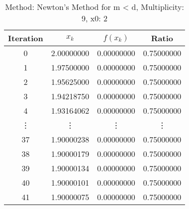 \begin{table}
\centering
\caption{Method: Newton's Method for m < d, Multiplicity: 9, x0: 2}
\label{tab:table_Newton's_Method_for_m_<_d_9_2}
\begin{tabular}{c c c c}
\toprule
Iteration &      $x_k$ &   $f(x_k)$ &      Ratio \\
\midrule
        0 & 2.00000000 & 0.00000000 & 0.75000000 \\
        1 & 1.97500000 & 0.00000000 & 0.75000000 \\
        2 & 1.95625000 & 0.00000000 & 0.75000000 \\
        3 & 1.94218750 & 0.00000000 & 0.75000000 \\
        4 & 1.93164062 & 0.00000000 & 0.75000000 \\
   \vdots &     \vdots &     \vdots &     \vdots \\
       37 & 1.90000238 & 0.00000000 & 0.75000000 \\
       38 & 1.90000179 & 0.00000000 & 0.75000000 \\
       39 & 1.90000134 & 0.00000000 & 0.75000000 \\
       40 & 1.90000101 & 0.00000000 & 0.75000000 \\
       41 & 1.90000075 & 0.00000000 & 0.75000000 \\
\bottomrule
\end{tabular}
\end{table}
